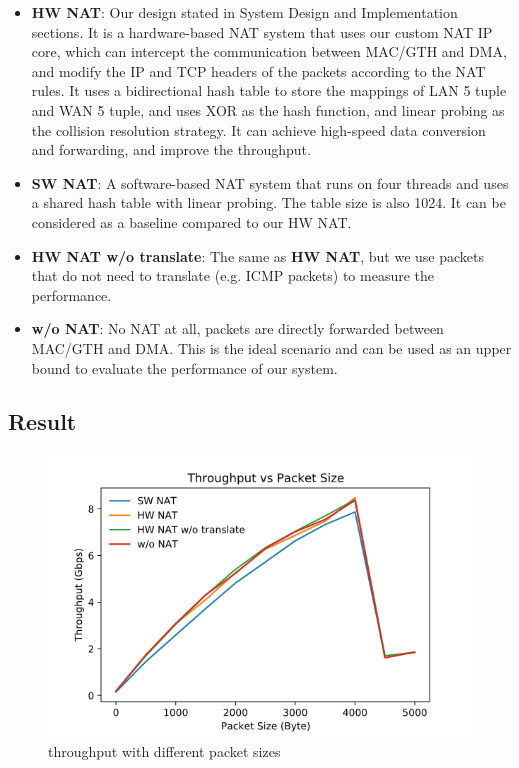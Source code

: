 \begin{itemize}
    \item {\textbf{HW NAT}}: Our design stated in System Design and Implementation sections. It is a hardware-based NAT system that uses our custom NAT IP core, which can intercept the communication between MAC/GTH and DMA, and modify the IP and TCP headers of the packets according to the NAT rules. It uses a bidirectional hash table to store the mappings of LAN 5 tuple and WAN 5 tuple, and uses XOR as the hash function, and linear probing as the collision resolution strategy. It can achieve high-speed data conversion and forwarding, and improve the throughput.
    \item {\textbf{SW NAT}}: A software-based NAT system that runs on four threads and uses a shared hash table with linear probing. The table size is also 1024. It can be considered as a baseline compared to our HW NAT.
    \item {\textbf{HW NAT w/o translate}}: The same as \textbf{HW NAT}, but we use packets that do not need to translate (e.g. ICMP packets) to measure the performance.
    \item {\textbf{w/o NAT}}: No NAT at all, packets are directly forwarded between MAC/GTH and DMA. This is the ideal scenario and can be used as an upper bound to evaluate the performance of our system.
\end{itemize}

\subsection{Result}

\begin{figure}[ht]
    \includegraphics[width=\linewidth]{images/Result1.png}
    \caption{throughput with different packet sizes}
    \label{fig:result1}
\end{figure}

